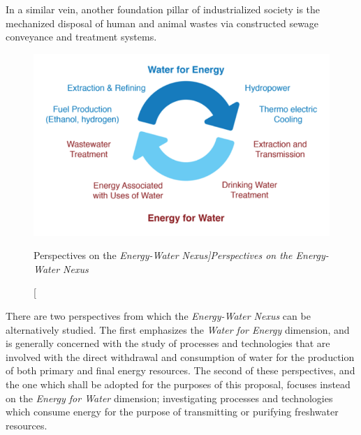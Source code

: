     In a similar vein, another foundation pillar of industrialized society is the mechanized disposal of human and animal wastes via constructed sewage conveyance and treatment systems. 
    
     \begin{figure}[Perspectives on the \it{Energy-Water Nexus}]
       \centering
       \includegraphics[width=4.5in]{figures/energy-water-nexus-perspectives.png}
       \caption[Perspectives on the \it{Energy-Water Nexus}]{Perspectives on the \it{Energy-Water Nexus}}
       \label{fig:energy-water-perspectives}
     \end{figure}
    
There are two perspectives from which the \textit{Energy-Water Nexus} can be alternatively studied. The first emphasizes the \textit{Water for Energy} dimension, and is generally concerned with the study of processes and technologies that are involved with the direct withdrawal and consumption of water for the production of both primary and final energy resources. The second of these perspectives, and the one which shall be adopted for the purposes of this proposal, focuses instead on the \textit{Energy for Water} dimension; investigating processes and technologies which consume energy for the purpose of transmitting or purifying freshwater resources. 
    
